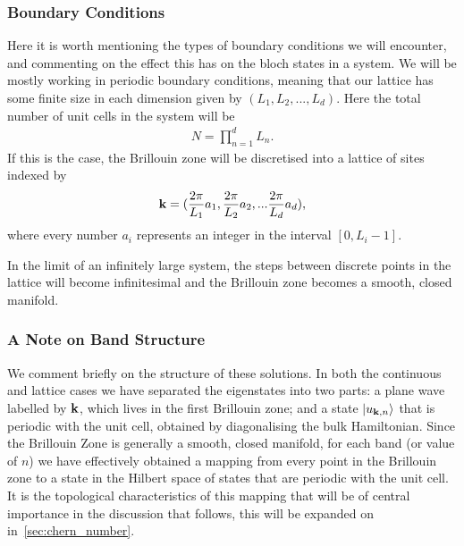 \subsubsection{Boundary Conditions}

Here it is worth mentioning the types of boundary conditions we will encounter, and commenting on the effect this has on the bloch states in a system. We will be mostly working in periodic boundary conditions, meaning that our lattice has some finite size in each dimension given by $(L_1,L_2, ... , L_d)$. Here the total number of unit cells in the system will be
\begin{align}
	N = \prod_{n=1}^{d}L_n.
\end{align}
If this is the case, the Brillouin zone will be discretised into a lattice of sites indexed by
\begin{align}
	\bf k = (\frac{2\pi}{L_1}a_1, \frac{2\pi}{L_2}a_2 , ... \frac{2\pi}{L_d} a_d),
\end{align}
where every number $a_i$ represents an integer in the interval $[0,L_i-1]$.\par
In the limit of an infinitely large system, the steps between discrete points in the lattice will become infinitesimal and the Brillouin zone becomes a smooth, closed manifold.

\subsubsection{A Note on Band Structure}
We comment briefly on the structure of these solutions. In both the continuous and lattice cases we have separated the eigenstates into two parts: a plane wave labelled by $\bf k$, which lives in the first Brillouin zone; and a state $\ket {u_{\bf k, n}}$ that is periodic with the unit cell, obtained by diagonalising the bulk Hamiltonian. Since the Brillouin Zone is generally a smooth, closed manifold, for each band (or value of $n$) we have effectively obtained a mapping from every point in the Brillouin zone to a state in the Hilbert space of states that are periodic with the unit cell. It is the topological characteristics of this mapping that will be of central importance in the discussion that follows, this will be expanded on in~\textsection\ref{sec:chern_number}. 

